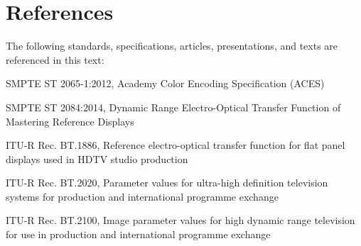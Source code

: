 \numberedformat
\chapter{References}
The following standards, specifications, articles, presentations, and texts are referenced in this text:

SMPTE ST 2065-1:2012, Academy Color Encoding Specification (ACES)

SMPTE ST 2084:2014, Dynamic Range Electro-Optical Transfer Function of Mastering Reference Displays

ITU-R Rec. BT.1886, Reference electro-optical transfer function for flat panel displays used in HDTV studio production

ITU-R Rec. BT.2020, Parameter values for ultra-high definition television systems for production and international programme exchange

ITU-R Rec. BT.2100, Image parameter values for high dynamic range television for use in production and international programme exchange